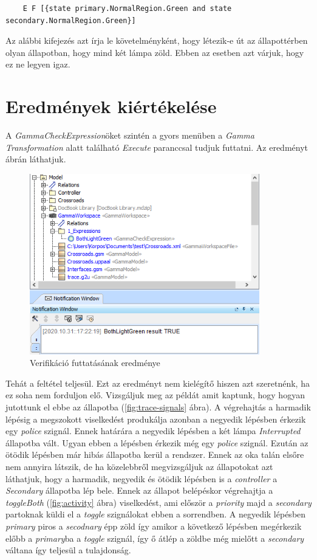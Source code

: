 \begin{lstlisting}	
	E F [{state primary.NormalRegion.Green and state secondary.NormalRegion.Green}]
\end{lstlisting}

Az alábbi kifejezés azt írja le követelményként, hogy létezik-e út az állapottérben olyan állapotban, hogy mind két lámpa zöld. Ebben az esetben azt várjuk, hogy ez ne legyen igaz.

\section{Eredmények kiértékelése}

A \emph{GammaCheckExpression}öket szintén a gyors menüben a  \emph{Gamma Transformation} alatt található \emph{Execute} paranccsal tudjuk futtatni. Az eredményt  ábrán láthatjuk.

\begin{figure}[!ht]
	\centering
	\includegraphics[width=10cm, keepaspectratio]{figures/contribution/verif1.png}
	\caption{Verifikáció futtatásának eredménye}
	\label{fig:verif1}
\end{figure}


Tehát a feltétel teljesül. Ezt az eredményt nem kielégítő hiszen azt szeretnénk, ha ez soha nem forduljon elő. Vizsgáljuk meg az példát amit kaptunk, hogy hogyan jutottunk el ebbe az állapotba (\ref{fig:trace-signals} ábra). A végrehajtás a harmadik lépésig a megszokott viselkedést produkálja azonban a negyedik lépésben érkezik egy \emph{police} szignál. Ennek határára a negyedik lépésben a két lámpa \emph{Interrupted} állapotba vált. Ugyan ebben a lépésben érkezik még egy \emph{police} szignál. Ezután az ötödik lépésben már hibás állapotba kerül a rendszer. Ennek az oka talán elsőre nem annyira látszik, de ha közelebbről megvizsgáljuk az állapotokat azt láthatjuk, hogy a  harmadik, negyedik és ötödik lépésben is a \emph{controller} a \emph{Secondary} állapotba lép bele. Ennek az állapot belépéskor végrehajtja a \emph{toggleBoth} (\ref{fig:activity} ábra) viselkedést, ami először a \emph{priority} majd a \emph{secondary} partoknak küldi el a \emph{toggle} szignálokat ebben a sorrendben. A negyedik lépésben \emph{primary} piros a \emph{secodnary} épp zöld így amikor a következő lépésben megérkezik előbb a \emph{primary}ba a \emph{toggle} szignál, így ő átlép a zöldbe még mielőtt a \emph{secondary} váltana így teljesül a tulajdonság.


